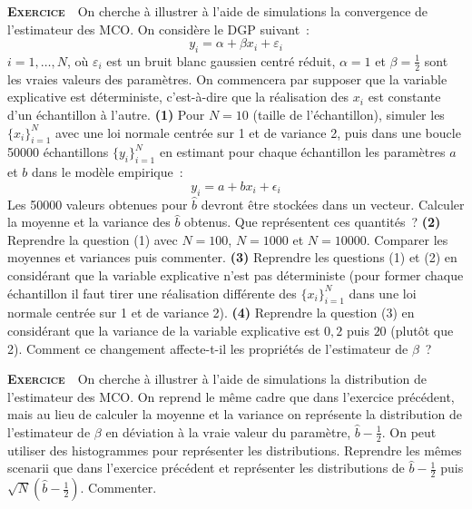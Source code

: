 \documentclass[10pt,a4paper,notitlepage]{article}
\newcounter{xnumber}
\newcommand{\exercice}{\refstepcounter{xnumber}\textsc{\textbf{Exercice}} \textbf{\thexnumber}\,\,}
\newcommand{\question}[1]{\textbf{(#1)}}
\begin{document}
\exercice\label{ex:mc-convergence} On cherche à illustrer à l'aide de simulations la convergence de
l'estimateur des MCO. On considère le DGP suivant~:
\[
y_i = \alpha + \beta x_i + \varepsilon_i
\]
$i=1,\dots, N$, où $\varepsilon_i$ est un bruit blanc gaussien centré réduit,
$\alpha=1$ et $\beta=\frac{1}{2}$ sont les vraies valeurs des paramètres. On
commencera par supposer que la variable explicative est déterministe,
c'est-à-dire que la réalisation des $x_i$ est constante d'un échantillon à
l'autre. \question{1} Pour $N=10$ (taille de l'échantillon), simuler
les $\{x_i\}_{i=1}^N$ avec une loi normale centrée sur 1 et de variance 2, puis
dans une boucle 50000 échantillons $\{y_i\}_{i=1}^N$ en estimant pour chaque
échantillon les paramètres $a$ et $b$ dans le modèle empirique~:
\[
y_i = a + b x_i + \epsilon_i
\]
Les 50000 valeurs obtenues pour $\hat b$ devront être stockées dans un
vecteur. Calculer la moyenne et la variance des $\hat b$ obtenus. Que
représentent ces quantités~? \question{2} Reprendre la question (1) avec
$N=100$, $N=1000$ et $N=10000$. Comparer les moyennes et variances puis
commenter. \question{3} Reprendre les questions (1) et (2) en considérant que la
variable explicative n'est pas déterministe (pour former chaque échantillon il
faut tirer une réalisation différente des $\{x_i\}_{i=1}^N$ dans une loi normale
centrée sur 1 et de variance 2). \question{4} Reprendre la question (3) en
considérant que la variance de la variable explicative est $0{,}2$ puis $20$
(plutôt que 2). Comment ce changement affecte-t-il les propriétés de
l'estimateur de $\beta$~?\newline

\bigskip

\exercice\label{ex:mc-distribution} On cherche à illustrer à l'aide de simulations la distribution de
l'estimateur des MCO. On reprend le même cadre que dans l'exercice précédent,
mais au lieu de calculer la moyenne et la variance on représente la distribution
de l'estimateur de $\beta$ en déviation à la vraie valeur du paramètre,
$\hat b-\frac{1}{2}$. On peut utiliser des histogrammes pour représenter
les distributions. Reprendre les mêmes scenarii que dans l'exercice précédent et
représenter les distributions de $\hat b-\frac{1}{2}$ puis
$\sqrt{N}\left(\hat b-\frac{1}{2}\right)$. Commenter.\newline

\bigskip
\end{document}
